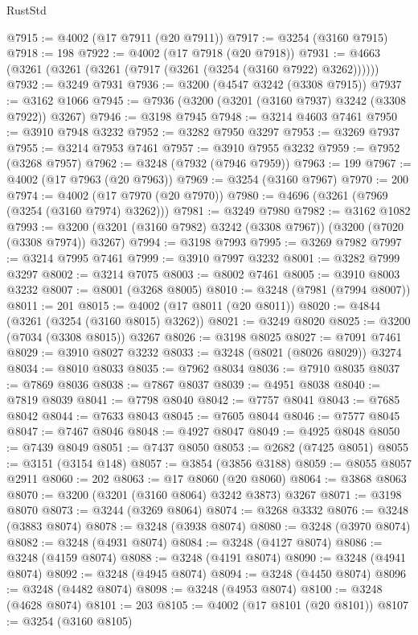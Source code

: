 \begin{lexlean}{RustStd}
\begin{coremodule}
@7915 := @4002 (@17 @7911 (@20 @7911))
@7917 := @3254 (@3160 @7915)
@7918 := 198
@7922 := @4002 (@17 @7918 (@20 @7918))
@7931 := @4663 (@3261 (@3261 (@3261 (@7917 (@3261 (@3254 (@3160 @7922) @3262))))))
@7932 := @3249 @7931
@7936 := @3200 (@4547 @3242 (@3308 @7915))
@7937 := @3162 @1066
@7945 := @7936 (@3200 (@3201 (@3160 @7937) @3242 (@3308 @7922)) @3267)
@7946 := @3198 @7945
@7948 := @3214 @4603 @7461
@7950 := @3910 @7948 @3232
@7952 := @3282 @7950 @3297
@7953 := @3269 @7937
@7955 := @3214 @7953 @7461
@7957 := @3910 @7955 @3232
@7959 := @7952 (@3268 @7957)
@7962 := @3248 (@7932 (@7946 @7959))
@7963 := 199
@7967 := @4002 (@17 @7963 (@20 @7963))
@7969 := @3254 (@3160 @7967)
@7970 := 200
@7974 := @4002 (@17 @7970 (@20 @7970))
@7980 := @4696 (@3261 (@7969 (@3254 (@3160 @7974) @3262)))
@7981 := @3249 @7980
@7982 := @3162 @1082
@7993 := @3200 (@3201 (@3160 @7982) @3242 (@3308 @7967)) (@3200 (@7020 (@3308 @7974)) @3267)
@7994 := @3198 @7993
@7995 := @3269 @7982
@7997 := @3214 @7995 @7461
@7999 := @3910 @7997 @3232
@8001 := @3282 @7999 @3297
@8002 := @3214 @7075
@8003 := @8002 @7461
@8005 := @3910 @8003 @3232
@8007 := @8001 (@3268 @8005)
@8010 := @3248 (@7981 (@7994 @8007))
@8011 := 201
@8015 := @4002 (@17 @8011 (@20 @8011))
@8020 := @4844 (@3261 (@3254 (@3160 @8015) @3262))
@8021 := @3249 @8020
@8025 := @3200 (@7034 (@3308 @8015)) @3267
@8026 := @3198 @8025
@8027 := @7091 @7461
@8029 := @3910 @8027 @3232
@8033 := @3248 (@8021 (@8026 @8029)) @3274
@8034 := @8010 @8033
@8035 := @7962 @8034
@8036 := @7910 @8035
@8037 := @7869 @8036
@8038 := @7867 @8037
@8039 := @4951 @8038
@8040 := @7819 @8039
@8041 := @7798 @8040
@8042 := @7757 @8041
@8043 := @7685 @8042
@8044 := @7633 @8043
@8045 := @7605 @8044
@8046 := @7577 @8045
@8047 := @7467 @8046
@8048 := @4927 @8047
@8049 := @4925 @8048
@8050 := @7439 @8049
@8051 := @7437 @8050
@8053 := @2682 (@7425 @8051)
@8055 := @3151 (@3154 @148)
@8057 := @3854 (@3856 @3188)
@8059 := @8055 @8057 @2911
@8060 := 202
@8063 := @17 @8060 (@20 @8060)
@8064 := @3868 @8063
@8070 := @3200 (@3201 (@3160 @8064) @3242 @3873) @3267
@8071 := @3198 @8070
@8073 := @3244 (@3269 @8064)
@8074 := @3268 @3332
@8076 := @3248 (@3883 @8074)
@8078 := @3248 (@3938 @8074)
@8080 := @3248 (@3970 @8074)
@8082 := @3248 (@4931 @8074)
@8084 := @3248 (@4127 @8074)
@8086 := @3248 (@4159 @8074)
@8088 := @3248 (@4191 @8074)
@8090 := @3248 (@4941 @8074)
@8092 := @3248 (@4945 @8074)
@8094 := @3248 (@4450 @8074)
@8096 := @3248 (@4482 @8074)
@8098 := @3248 (@4953 @8074)
@8100 := @3248 (@4628 @8074)
@8101 := 203
@8105 := @4002 (@17 @8101 (@20 @8101))
@8107 := @3254 (@3160 @8105)

\end{coremodule}
\end{lexlean}
